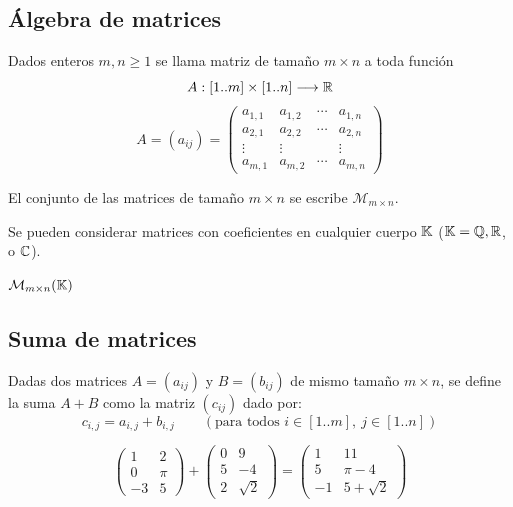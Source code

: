 \documentclass[11pt,a4paper]{article}
\newcommand{\M}{\mathcal{M}}
\begin{document}
\subsection{Álgebra de matrices}

\begin{definicion}[Matriz]
Dados enteros $m,n\geq1$ se llama matriz de tamaño $m\times n$ a toda función
\[
A:[1..m]\times[1..n]\longrightarrow\mathbb{R}
\]
\[
A=(a_{ij})=\begin{pmatrix}
a_{1,1} & a_{1,2} & \cdots & a_{1,n}\\
a_{2,1} & a_{2,2} & \cdots & a_{2,n}\\
\vdots & \vdots & & \vdots\\
a_{m,1} & a_{m,2} & \cdots & a_{m,n}
\end{pmatrix}
\]
\end{definicion}

El conjunto de las matrices de tamaño $m\times n$ se escribe $\M_{m\times n}$.

\begin{observacion}
Se pueden considerar matrices con coeficientes en cualquier cuerpo $\mathbb{K}$ ($\mathbb{K}=\mathbb{Q},\mathbb{R}$, o $\mathbb{C}$).
\end{observacion}

\begin{notacion}
$\M_{m\times n}(\K)$
\end{notacion}

\subsection{Suma de matrices}

\begin{definicion}
Dadas dos matrices $A=(a_{ij})$ y $B=(b_{ij})$ de mismo tamaño $m\times n$, se define la suma $A+B$ como la matriz $(c_{ij})$ dado por:
\[
c_{i,j}=a_{i,j}+b_{i,j}\qquad(\text{para todos } i\in[1..m],\ j\in[1..n])
\]
\end{definicion}

\begin{ejemplo}
\[
\begin{pmatrix}1&2\\0&\pi\\-3&5\end{pmatrix}+
\begin{pmatrix}0&9\\5&-4\\2&\sqrt2\end{pmatrix}=
\begin{pmatrix}1&11\\5&\pi-4\\-1&5+\sqrt2\end{pmatrix}
\]
\end{ejemplo}
\end{document}
